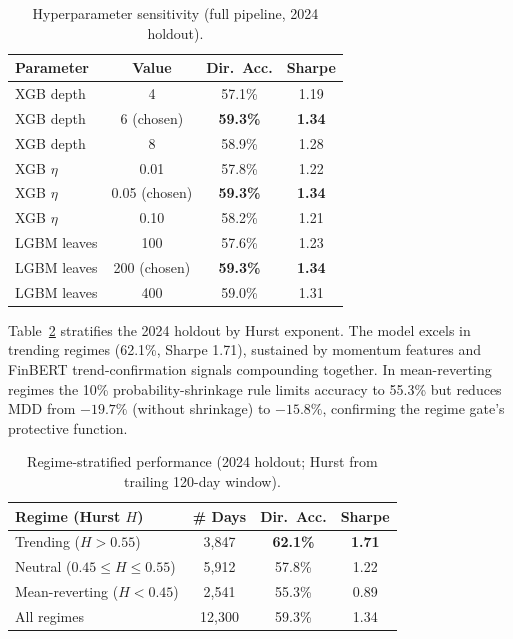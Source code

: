 \documentclass[12pt,a4paper]{article}
\begin{document}
\begin{table}[h]
\centering
\caption{Hyperparameter sensitivity (full pipeline, 2024 holdout).}
\label{tab:hyper}
\footnotesize
\begin{tabular}{lccc}
\toprule
\textbf{Parameter} & \textbf{Value} & \textbf{Dir.\ Acc.} & \textbf{Sharpe} \\
\midrule
XGB depth   & 4           & 57.1\% & 1.19 \\
XGB depth   & 6 (chosen)  & \textbf{59.3\%} & \textbf{1.34} \\
XGB depth   & 8           & 58.9\% & 1.28 \\
XGB $\eta$  & 0.01        & 57.8\% & 1.22 \\
XGB $\eta$  & 0.05 (chosen) & \textbf{59.3\%} & \textbf{1.34} \\
XGB $\eta$  & 0.10        & 58.2\% & 1.21 \\
LGBM leaves & 100         & 57.6\% & 1.23 \\
LGBM leaves & 200 (chosen) & \textbf{59.3\%} & \textbf{1.34} \\
LGBM leaves & 400         & 59.0\% & 1.31 \\
\bottomrule
\end{tabular}
\end{table}

Table~\ref{tab:regime} stratifies the 2024 holdout by Hurst exponent. The model
excels in trending regimes (62.1\%, Sharpe 1.71), sustained by momentum features
and FinBERT trend-confirmation signals compounding together. In mean-reverting
regimes the 10\% probability-shrinkage rule limits accuracy to 55.3\% but reduces
MDD from $-19.7\%$ (without shrinkage) to $-15.8\%$, confirming the regime gate's
protective function.

\begin{table}[h]
\centering
\caption{Regime-stratified performance (2024 holdout; Hurst from trailing 120-day window).}
\label{tab:regime}
\footnotesize
\begin{tabular}{lccc}
\toprule
\textbf{Regime (Hurst $H$)} & \textbf{\# Days} & \textbf{Dir.\ Acc.} & \textbf{Sharpe} \\
\midrule
Trending ($H>0.55$)            & 3{,}847  & \textbf{62.1\%} & \textbf{1.71} \\
Neutral ($0.45\leq H\leq 0.55$) & 5{,}912  & 57.8\% & 1.22 \\
Mean-reverting ($H<0.45$)      & 2{,}541  & 55.3\% & 0.89 \\
All regimes                    & 12{,}300 & 59.3\% & 1.34 \\
\bottomrule
\end{tabular}
\end{table}
\end{document}
